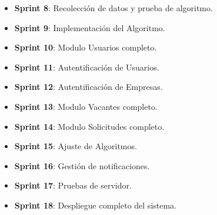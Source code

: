 \begin{itemize}
    \item \textbf{Sprint 8}:  Recolección de datos y prueba de algoritmo.
    \item \textbf{Sprint 9}:  Implementación del Algoritmo.
    \item \textbf{Sprint 10}: Modulo Usuarios completo.
    \item \textbf{Sprint 11}: Autentificación de Usuarios. 
    \item \textbf{Sprint 12}: Autentificación de Empresas.
    \item \textbf{Sprint 13}: Modulo Vacantes completo.
    \item \textbf{Sprint 14}: Modulo Solicitudes completo.
    \item \textbf{Sprint 15}: Ajuste de Algoritmos.
    \item \textbf{Sprint 16}: Gestión de notificaciones.
    \item \textbf{Sprint 17}: Pruebas de servidor.
    \item \textbf{Sprint 18}: Despliegue completo del sistema.
\end{itemize}
